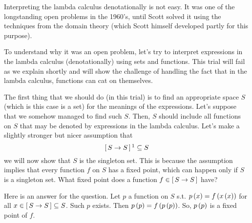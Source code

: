 \begin{enumcirc}
	\item
	Interpreting the lambda calculus denotationally is not easy.
	It was one of the longstanding open problems in the 1960's, until Scott solved
	it using the techniques from the domain theory (which Scott himself developed
	partly for this purpose).
	\item
	To understand why it was an open problem, let's try to interpret expressions in
	the lambda calculus (denotationally) using sets and functions.
	This trial will fail as we explain shortly and will show the challenge of
	handling the fact that in the lambda calculus, functions can cat on themselves.

	The first thing that we should do (in this trial) is to find an appropriate
	space $S$ (which is this case is a set) for the meanings of the expressions.
	Let's suppose that we somehow managed to find such $S$.
	Then, $S$ should include all functions on $S$ that may be denoted by
	expressions in the lambda calculus.
	Let's make a slightly stronger but nicer assumption that
	\[
		\brackets{S \rightarrow S}\footnotemark \subseteq S
	\]
	we will now show that $S$ is the singleton set.
	This is because the assumption implies that every function $f$ on $S$ has a
	fixed point, which can happen only if $S$ is a singleton set.
	What fixed point does a function $f \in \left[ \, S \rightarrow S \, \right]$ have?

	Here is an answer for the question.
	Let $p$ a function on $S$ s.t. $p\left( x \right) = f\left( x\left( x \right) \right)$ for all
	$x \in \left[ \, S \rightarrow S \, \right] \subseteq S$.
	Such $p$ exists.
	Then $p\left( p \right) = f\left( p\left( p \right) \right)$.
	So, $p\left( p \right)$ is a fixed point of $f$.


\end{enumcirc}

